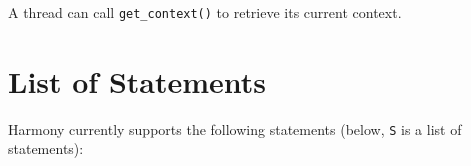 \documentclass{report}
\begin{document}

A thread can call \texttt{get\_context()} to retrieve its current
context.

\chapter{List of Statements}

Harmony currently supports the following statements (below, \texttt{S} is a list of statements):
\end{document}
